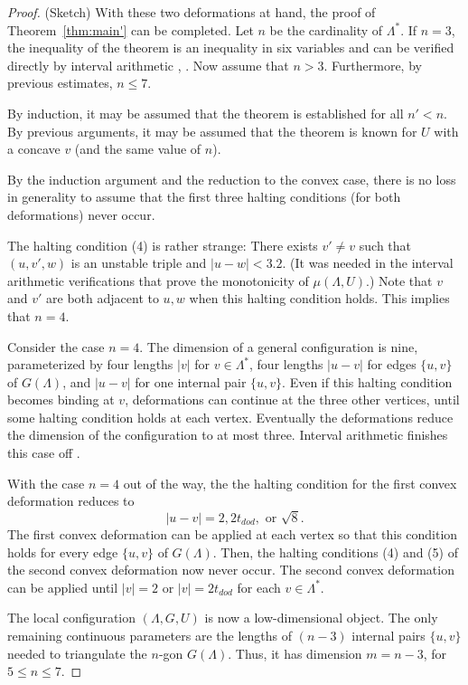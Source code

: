 \begin{proof} (Sketch)
With these two deformations at hand, the proof
of Theorem~\ref{thm:main'} can be completed.  Let $n$ be
the cardinality of $\Lambda^*$.
If $n=3$, the inequality of the theorem is an inequality
in six variables and can be verified directly by interval
arithmetic \cite{code}, \cite[\S7.4.1]{arx}.  Now assume
that $n>3$.  Furthermore, by previous estimates, $n\le 7$.


By induction, it may be assumed that
the theorem is established for all $n'<n$.  By previous arguments,
it may be assumed that the theorem is known for $U$ with a concave
$v$ (and the same value of $n$).

By the induction argument and the reduction to the convex case,
there is no loss in generality to assume that the first three
halting conditions (for both deformations) never occur.  

The  halting condition (4) is rather strange:
There exists $v'\ne v$ such that 
$(u,v',w)$ is an unstable triple and $|u-w|<3.2$.
(It was needed in the interval arithmetic verifications
that prove the monotonicity of $\mu(\Lambda,U)$.)  Note
that $v$ and $v'$ are both adjacent to $u,w$ when this
halting condition holds.  This implies that $n=4$.  

Consider the case $n=4$.  The dimension of a general configuration
is nine, parameterized by four lengths $|v|$ for $v\in\Lambda^*$,
four lengths $|u-v|$ for edges $\{u,v\}$ of $G(\Lambda)$, and $|u-v|$
for one internal pair $\{u,v\}$.
Even
if this halting condition becomes binding at $v$, deformations
can continue at the three other vertices, until some halting
condition holds at each vertex.  Eventually the deformations
reduce the dimension of the configuration to at most three.
Interval arithmetic finishes this case off \cite[\S7.4.2]{arx}.

With the case $n=4$ out of the way, the
the halting condition for the first convex deformation
reduces to
  $$
  |u-v| = 2, 2t_{dod}, \text{ or } \sqrt8.
  $$
The first convex deformation can be applied at each vertex 
so that this condition holds for every edge $\{u,v\}$ of $G(\Lambda)$.
Then, the halting conditions (4) and (5) of the second convex
deformation now never occur.  The second convex deformation can
be applied until $|v|=2$ or $|v|=2t_{dod}$ for each $v\in\Lambda^*$.

The local configuration $(\Lambda,G,U)$ is now a low-dimensional
object.  The only remaining continuous parameters are the lengths of
$(n-3)$ internal pairs $\{u,v\}$ needed to triangulate the
$n$-gon $G(\Lambda)$.  Thus, it has dimension $m=n-3$,
for $5\le n\le 7$.


\end{proof}
